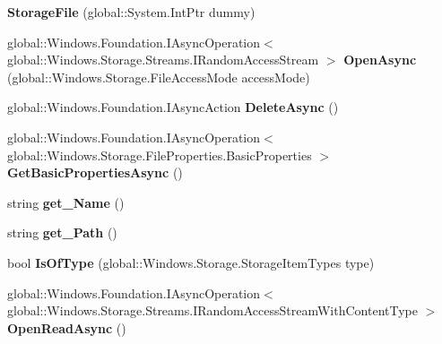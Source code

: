 \begin{DoxyCompactItemize}
{\bfseries Storage\+File} (global\+::\+System.\+Int\+Ptr dummy)
\item 
\mbox{\label{class_windows_1_1_storage_1_1_storage_file_a29ee2f060ba92e79eabded8b48966776}} 
global\+::\+Windows.\+Foundation.\+I\+Async\+Operation$<$ global\+::\+Windows.\+Storage.\+Streams.\+I\+Random\+Access\+Stream $>$ {\bfseries Open\+Async} (global\+::\+Windows.\+Storage.\+File\+Access\+Mode access\+Mode)
\item 
\mbox{\label{class_windows_1_1_storage_1_1_storage_file_a6d0d928c1dc9abd71b250099c2de27f1}} 
global\+::\+Windows.\+Foundation.\+I\+Async\+Action {\bfseries Delete\+Async} ()
\item 
\mbox{\label{class_windows_1_1_storage_1_1_storage_file_acf51ed8048b0f4497f173a6c8addf43f}} 
global\+::\+Windows.\+Foundation.\+I\+Async\+Operation$<$ global\+::\+Windows.\+Storage.\+File\+Properties.\+Basic\+Properties $>$ {\bfseries Get\+Basic\+Properties\+Async} ()
\item 
\mbox{\label{class_windows_1_1_storage_1_1_storage_file_a7a2ef38514c8d6dc439918de9aa6feb7}} 
string {\bfseries get\+\_\+\+Name} ()
\item 
\mbox{\label{class_windows_1_1_storage_1_1_storage_file_ad961bebed52f4f6b04a97201c511e841}} 
string {\bfseries get\+\_\+\+Path} ()
\item 
\mbox{\label{class_windows_1_1_storage_1_1_storage_file_aab7da0a2a5ea0ef0219616c0ebbf92e7}} 
bool {\bfseries Is\+Of\+Type} (global\+::\+Windows.\+Storage.\+Storage\+Item\+Types type)
\item 
\mbox{\label{class_windows_1_1_storage_1_1_storage_file_a35c626039408667e2520e113fb58342d}} 
global\+::\+Windows.\+Foundation.\+I\+Async\+Operation$<$ global\+::\+Windows.\+Storage.\+Streams.\+I\+Random\+Access\+Stream\+With\+Content\+Type $>$ {\bfseries Open\+Read\+Async} ()
\item 
\mbox{\label{class_windows_1_1_storage_1_1_storage_file_adc6fa1909202e33273e037fa3347c319}} 

\end{DoxyCompactItemize}
